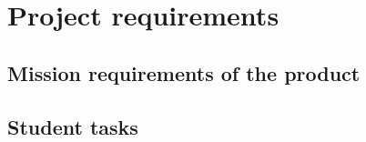 
\section{Project requirements}

\subsection{Mission requirements of the product}

\subsection{Student tasks}

\newpage



